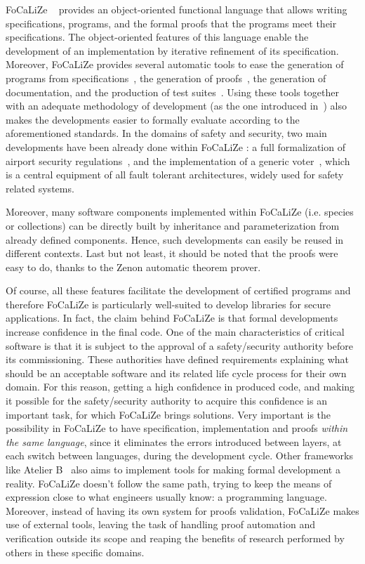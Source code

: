 \documentclass[submission,copyright,creativecommons]{eptcs}
\def\focalize{FoCaLiZe \mbox{}}
\begin{document}
\focalize~\cite{foc03} provides an object-oriented
functional language that allows writing specifications, programs, and the
formal proofs that the programs meet their specifications. The object-oriented
features of this language enable the development of an implementation
by iterative refinement of its specification. Moreover, \focalize
provides several automatic tools to ease the generation of programs
from specifications~\cite{jfl2010}, the generation of
proofs~\cite{conf/lpar/BonichonDD07}, the generation of
documentation, and the production of
test suites~\cite{DBLP:conf/tap/CarlierD08,DBLP:conf/icsoft/CarlierDG10}.
Using these tools together
with an adequate methodology of development (as the one introduced
in~\cite{DBLP:journals/entcs/AyraultHP09}) also makes the developments
easier to formally evaluate  according to the aforementioned standards.
In the domains of safety and security, two main developments have been already
done within \focalize: a full formalization of airport security
regulations~\cite{DelahayeED06}, and 
the implementation of
a generic voter~\cite{DBLP:conf/tap/AyraultHP09}, which is a central
equipment of all
fault tolerant architectures, widely used for safety related systems.

 Moreover, many software
components implemented within \focalize (i.e. species or collections) can be directly built by
inheritance and parameterization from already defined components.
Hence, such developments can easily be reused in different contexts.
Last but not least, it should be noted that the proofs were easy to
do, thanks to the Zenon automatic theorem prover.

Of course, all these features facilitate the development of certified programs and
therefore \focalize
is particularly well-suited to develop libraries for
secure applications. 
In fact,
the claim behind \focalize is that formal developments increase
confidence in the final code. One of the main characteristics of
critical software is that it is subject to the approval of a
safety/security authority before its commissioning. These authorities
have defined requirements explaining what should be an acceptable
software and its related life cycle process for their own domain. For
this reason, getting a high confidence in produced code, and making it
possible for the safety/security authority to acquire this confidence
is an important task, for which \focalize brings solutions.
Very important is the possibility in \focalize to have
specification, implementation and proofs \emph{within the same
language}, since it
eliminates the errors introduced between layers, at each switch
between languages, during the development cycle.
Other frameworks like Atelier B~\cite{Abrial96a} also aims to implement
tools for making formal development a reality. \focalize doesn't follow
the same path, trying to keep the means of expression close to what
engineers usually know: a programming language.
Moreover, instead of having its own system for proofs validation,
\focalize makes use of external tools, leaving the task of handling
proof automation and verification outside its scope and reaping
the benefits of research performed by others in these specific domains.
\end{document}
